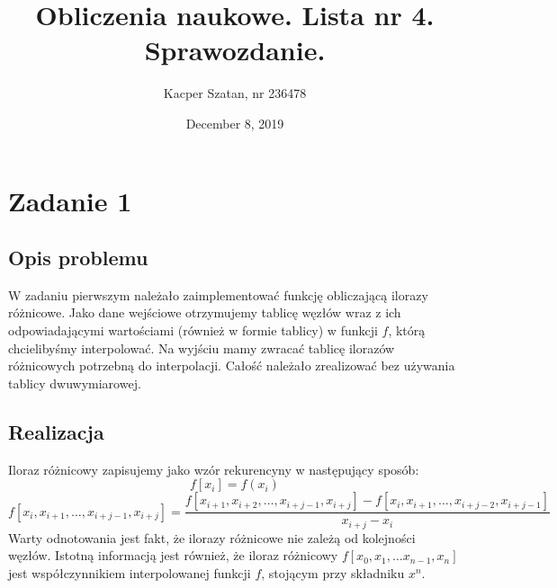 \documentclass[]{article}
\title{Obliczenia naukowe. Lista nr 4. Sprawozdanie.}
\author{Kacper Szatan, nr 236478}
\date{December 8, 2019}
\begin{document}
\maketitle
\section{Zadanie 1}
\subsection{Opis problemu}
W zadaniu pierwszym należało zaimplementować funkcję obliczającą ilorazy różnicowe. Jako dane wejściowe otrzymujemy tablicę węzłów wraz z ich odpowiadającymi wartościami (również w formie tablicy) w funkcji $f$, którą chcielibyśmy interpolować. Na wyjściu mamy zwracać tablicę ilorazów różnicowych potrzebną do interpolacji. Całość należało zrealizować bez używania tablicy dwuwymiarowej.
\subsection{Realizacja}
Iloraz różnicowy zapisujemy jako wzór rekurencyny w następujący sposób:
\begin{equation}
f[x_i] = f(x_i)
\end{equation}
\begin{equation}
f[x_i, x_{i+1}, \ldots, x_{i+j-1}, x_{i+j}] = \frac{f[x_{i+1}, x_{i+2}, \ldots, x_{i+j - 1}, x_{i+j}] - f[x_{i}, x_{i+1}, \ldots, x_{i+j-2}, x_{i+j-1}]}{x_{i+j} - x_i}
\end{equation}
Warty odnotowania jest fakt, że ilorazy różnicowe nie zależą od kolejności węzłów. Istotną informacją jest również, że iloraz różnicowy $f[x_0, x_1, \ldots x_{n-1}, x_n]$ jest współczynnikiem interpolowanej funkcji $f$, stojącym przy składniku $x^n$.
\end{document}

